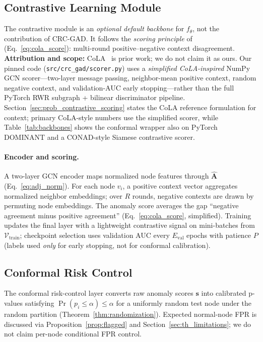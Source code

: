 \documentclass[a4paper]{cas-dc}
\theoremstyle{definition}
\begin{document}
\subsection{Contrastive Learning Module}
\label{sec:meth_training}

The contrastive module is an \emph{optional default backbone} for $f_\theta$, not the contribution of CRC-GAD.  It follows the \emph{scoring principle} of~\cite{liu2022cola} (Eq.~\eqref{eq:cola_score}): multi-round positive--negative context disagreement.  \textbf{Attribution and scope:} CoLA~\cite{liu2022cola} is prior work; we do not claim it as ours.  Our pinned code (\texttt{src/crc\_gad/scorer.py}) uses a \emph{simplified CoLA-inspired} NumPy GCN scorer---two-layer message passing, neighbor-mean positive context, random negative context, and validation-AUC early stopping---rather than the full PyTorch RWR subgraph + bilinear discriminator pipeline.  Section~\ref{sec:prob_contrastive_scoring} states the CoLA reference formulation for context; primary CoLA-style numbers use the simplified scorer, while Table~\ref{tab:backbones} shows the conformal wrapper also on PyTorch DOMINANT and a CONAD-style Siamese contrastive scorer.

\paragraph{Encoder and scoring.}
A two-layer GCN encoder maps normalized node features through $\hat{\mathbf{A}}$ (Eq.~\eqref{eq:adj_norm}).  For each node $v_i$, a positive context vector aggregates normalized neighbor embeddings; over $R$ rounds, negative contexts are drawn by permuting node embeddings.  The anomaly score averages the gap ``negative agreement minus positive agreement'' (Eq.~\eqref{eq:cola_score}, simplified).  Training updates the final layer with a lightweight contrastive signal on mini-batches from $\mathcal{V}_{\text{train}}$; checkpoint selection uses validation AUC every $E_{\text{val}}$ epochs with patience $P$ (labels used \emph{only} for early stopping, not for conformal calibration).

\subsection{Conformal Risk Control}
\label{sec:meth_conformal}

The conformal risk-control layer converts raw anomaly scores $\mathbf{s}$ into calibrated p-values satisfying $\Pr(p_i \leq \alpha) \leq \alpha$ for a uniformly random test node under the random partition (Theorem~\ref{thm:randomization}).  Expected normal-node FPR is discussed via Proposition~\ref{prop:flagged} and Section~\ref{sec:th_limitations}; we do not claim per-node conditional FPR control.
\end{document}
